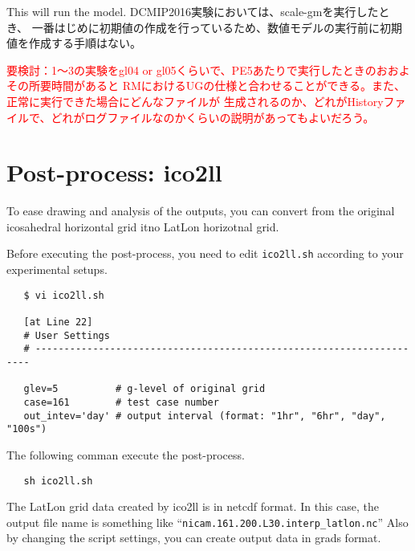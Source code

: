 This will run the model.
DCMIP2016実験においては、scale-gmを実行したとき、
一番はじめに初期値の作成を行っているため、数値モデルの実行前に初期値を作成する手順はない。

\textcolor{red}{要検討：1〜3の実験をgl04 or gl05くらいで、PE5あたりで実行したときのおおよその所要時間があると
 RMにおけるUGの仕様と合わせることができる。また、正常に実行できた場合にどんなファイルが
 生成されるのか、どれがHistoryファイルで、どれがログファイルなのかくらいの説明があってもよいだろう。}



\section{Post-process: ico2ll}
To ease drawing and analysis of the outputs, you can convert 
from the original icosahedral horizontal grid itno LatLon horizotnal grid.

Before executing the post-process, you need to edit \verb|ico2ll.sh|
according to your experimental setups.
 \begin{verbatim}
   $ vi ico2ll.sh

   [at Line 22]
   # User Settings
   # ---------------------------------------------------------------------

   glev=5          # g-level of original grid
   case=161        # test case number
   out_intev='day' # output interval (format: "1hr", "6hr", "day", "100s")
 \end{verbatim}

 \noindent The following comman execute the post-process.
 \begin{verbatim}
   sh ico2ll.sh
 \end{verbatim}

 \noindent The LatLon grid data created by ico2ll is in netcdf format. 
In this case, the output file name is something like 
``\verb|nicam.161.200.L30.interp_latlon.nc|''
Also by changing the script settings, you can create output data in 
grads format. 
